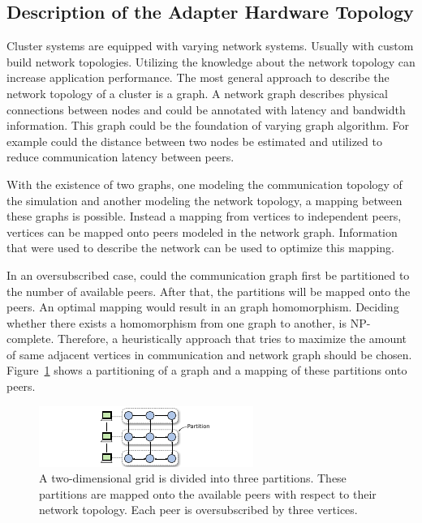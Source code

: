 \subsection*{Description of the Adapter Hardware Topology}

Cluster systems are equipped with varying network systems. Usually
with custom build network topologies.  Utilizing the knowledge about
the network topology can increase application performance.  The most
general approach to describe the network topology of a cluster is a
graph. A network graph describes physical connections between nodes
and could be annotated with latency and bandwidth information.  This
graph could be the foundation of varying graph algorithm. For
example could the distance between two nodes be estimated and
utilized to reduce communication latency between peers.

With the existence of two graphs, one modeling the communication
topology of the simulation and another modeling the network
topology, a mapping between these graphs is possible.  Instead a
mapping from vertices to independent peers, vertices can be mapped
onto peers modeled in the network graph. Information that were used
to describe the network can be used to optimize this mapping.

In an oversubscribed case, could the communication graph first be
partitioned to the number of available peers. After that, the
partitions will be mapped onto the peers.  An optimal mapping would
result in an graph homomorphism. Deciding whether there exists a
homomorphism from one graph to another, is NP-complete. Therefore, a
heuristically approach that tries to maximize the amount of same
adjacent vertices in communication and network graph should be
chosen. Figure~\ref{fig:graph_partitioning} shows a partitioning
of a graph and a mapping of these partitions onto peers.

\begin{figure}[H]
  \centering \includegraphics[width=\textwidth]{graphics/60_graph_partitioning}
  \caption{A two-dimensional grid is divided into three partitions.
    These partitions are mapped onto the available peers with respect
    to their network topology. Each peer is oversubscribed by three
    vertices.}
  \label{fig:graph_partitioning}
\end{figure}

